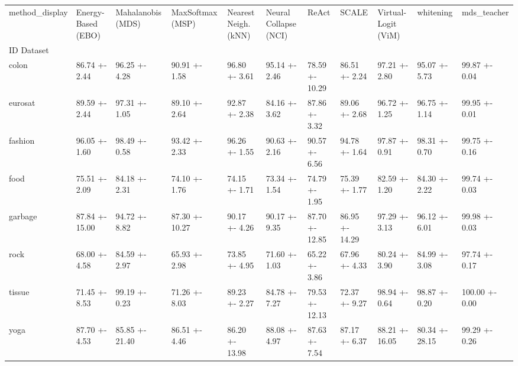\begin{tabular}{lllllllllll}
\toprule
method_display & Energy-Based (EBO) & Mahalanobis (MDS) & MaxSoftmax (MSP) & Nearest Neigh. (kNN) & Neural Collapse (NCI) & ReAct & SCALE & Virtual-Logit (ViM) & whitening & mds_teacher \\
ID Dataset &  &  &  &  &  &  &  &  &  &  \\
\midrule
colon & 86.74 +- 2.44 & 96.25 +- 4.28 & 90.91 +- 1.58 & 96.80 +- 3.61 & 95.14 +- 2.46 & 78.59 +- 10.29 & 86.51 +- 2.24 & 97.21 +- 2.80 & 95.07 +- 5.73 & 99.87 +- 0.04 \\
eurosat & 89.59 +- 2.44 & 97.31 +- 1.05 & 89.10 +- 2.64 & 92.87 +- 2.38 & 84.16 +- 3.62 & 87.86 +- 3.32 & 89.06 +- 2.68 & 96.72 +- 1.25 & 96.75 +- 1.14 & 99.95 +- 0.01 \\
fashion & 96.05 +- 1.60 & 98.49 +- 0.58 & 93.42 +- 2.33 & 96.26 +- 1.55 & 90.63 +- 2.16 & 90.57 +- 6.56 & 94.78 +- 1.64 & 97.87 +- 0.91 & 98.31 +- 0.70 & 99.75 +- 0.16 \\
food & 75.51 +- 2.09 & 84.18 +- 2.31 & 74.10 +- 1.76 & 74.15 +- 1.71 & 73.34 +- 1.54 & 74.79 +- 1.95 & 75.39 +- 1.77 & 82.59 +- 1.20 & 84.30 +- 2.22 & 99.74 +- 0.03 \\
garbage & 87.84 +- 15.00 & 94.72 +- 8.82 & 87.30 +- 10.27 & 90.17 +- 4.26 & 90.17 +- 9.35 & 87.70 +- 12.85 & 86.95 +- 14.29 & 97.29 +- 3.13 & 96.12 +- 6.01 & 99.98 +- 0.03 \\
rock & 68.00 +- 4.58 & 84.59 +- 2.97 & 65.93 +- 2.98 & 73.85 +- 4.95 & 71.60 +- 1.03 & 65.22 +- 3.86 & 67.96 +- 4.33 & 80.24 +- 3.90 & 84.99 +- 3.08 & 97.74 +- 0.17 \\
tissue & 71.45 +- 8.53 & 99.19 +- 0.23 & 71.26 +- 8.03 & 89.23 +- 2.27 & 84.78 +- 7.27 & 79.53 +- 12.13 & 72.37 +- 9.27 & 98.94 +- 0.64 & 98.87 +- 0.20 & 100.00 +- 0.00 \\
yoga & 87.70 +- 4.53 & 85.85 +- 21.40 & 86.51 +- 4.46 & 86.20 +- 13.98 & 88.08 +- 4.97 & 87.63 +- 7.54 & 87.17 +- 6.37 & 88.21 +- 16.05 & 80.34 +- 28.15 & 99.29 +- 0.26 \\
\bottomrule
\end{tabular}
